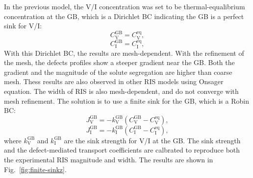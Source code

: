 \documentclass[12pt]{article}
\newcommand{\Vac}{\mathrm{V}}          %
\newcommand{\Int}{\mathrm{I}}          %
\newcommand{\GB}{\mathrm{GB}}
\newcommand{\eq}{\mathrm{eq}}
\begin{document}
In the previous model, the V/I concentration was set to be thermal-equalibrium concentration at the GB, which is a Dirichlet BC indicating the GB is a perfect sink for V/I:
\begin{equation}
C_{\Vac}^{\GB}=C_{\Vac}^{\eq},
\end{equation}
\begin{equation}
C_{\Int}^{\GB}=C_{\Int}^{\eq},
\end{equation}
With this Dirichlet BC, the results are mesh-dependent. With the refinement of the mesh, the defects profiles show a steeper gradient near the GB. Both the gradient and the magnitude of the solute segregation are higher than coarse mesh. Thess results are also observed in other RIS models using Onsager equation. \cite{oplinger2026radiationinduced} 
The width of RIS is also mesh-dependent, and do not converge with mesh refinement. The solution is to use a finite sink for the GB, which is a Robin BC:
\begin{equation}
J_{\Vac}^{\GB}=-k_{\Vac}^{\GB}\left(C_{\Vac}^{\GB}-C_{\Vac}^{\eq}\right),
\end{equation}
\begin{equation}
J_{\Int}^{\GB}=-k_{\Int}^{\GB}\left(C_{\Int}^{\GB}-C_{\Int}^{\eq}\right),
\end{equation}
where $k_{\Vac}^{\GB}$ and $k_{\Int}^{\GB}$ are the sink strength for V/I at the GB. The sink strength and the defect-mediated transport coefficients are calbrated to reproduce both the experimental RIS magnitude and width. The results are shown in Fig.~\ref{fig:finite-sinkz}.
\end{document}
